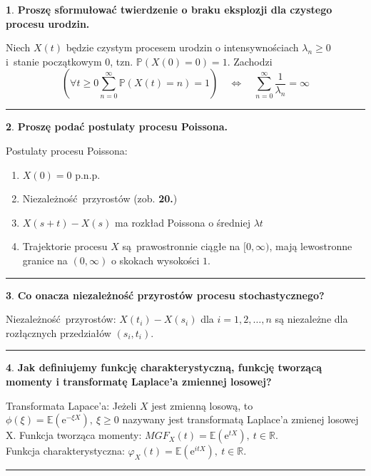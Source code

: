 \documentclass[
    twocolumn,
    twoside,
    fontsize=11pt,
    paper=A0,
    DIV=30
]{scrartcl}
\theoremstyle{definition}
\newtheorem{pytanie}{}
\theoremstyle{break}
\newenvironment{odpowiedź}{\vspace{-0.7em}}{\vspace{0.3em}\hrule}
\newcommand*{\e}{\mathrm{e}}
\begin{document}
\begin{pytanie}
\textbf{Proszę sformułować twierdzenie o braku eksplozji dla czystego procesu urodzin.}
\end{pytanie}
\begin{odpowiedź}
    Niech $X(t)$ będzie czystym procesem urodzin
    o intensywnościach $\lambda_n \geq 0$ i~stanie początkowym 0,
    tzn. $\mathbb{P}(X(0)=0)=1$. Zachodzi \[
        \left(\forall t \geq 0 \sum_{n = 0}^\infty
        \mathbb{P}(X(t)=n)=1\right) \quad \iff \quad
        \sum_{n = 0}^\infty \frac 1 {\lambda_n} = \infty
    \] 
\end{odpowiedź}


\begin{pytanie}
\textbf{Proszę podać postulaty procesu Poissona.}
\end{pytanie}
\begin{odpowiedź}
    Postulaty procesu Poissona:
    \begin{enumerate}
        \item $X(0) = 0$ p.n.p.
        \item Niezależność przyrostów (zob. {\bf 20.})
        \item $X(s+t)-X(s)$ ma rozkład Poissona o średniej $\lambda t$
        \item Trajektorie procesu $X$ są prawostronnie ciągłe
            na $[0, \infty)$, mają lewostronne granice na $(0, \infty )$
            o skokach wysokości $1$.
    \end{enumerate}
\end{odpowiedź}


\begin{pytanie}
\textbf{Co onacza niezależność przyrostów procesu stochastycznego?}
\end{pytanie}
\begin{odpowiedź}
    Niezależność przyrostów:
    $X(t_i)-X(s_i)$ dla $i=1,2,\ldots,n$
    są niezależne dla rozłącznych przedziałów $(s_i,t_i)$.
\end{odpowiedź}


\begin{pytanie}
\textbf{Jak definiujemy funkcję charakterystyczną, funkcję tworzącą momenty i transformatę Laplace'a zmiennej losowej?}
\end{pytanie}
\begin{odpowiedź}
    Transformata Lapace'a: Jeżeli $X$ jest zmienną losową, to $\phi (\xi) = \mathbb{E}(\e^{-\xi X}), \ \xi \geq 0$ nazywany jest transformatą Laplace'a zmienej losowej X.
    Funkcja tworząca momenty: $MGF_X(t) = \mathbb{E} (\e^{tX}), \ t \in \mathbb{R}$. \\
    Funkcja charakterystyczna: $\varphi_X(t) = \mathbb{E} (\e^{itX}), \ t \in \mathbb{R}$. \\
\end{odpowiedź}
\end{document}
